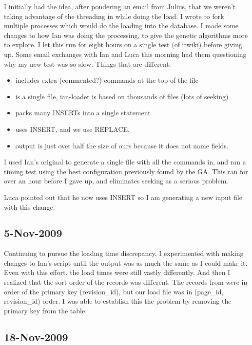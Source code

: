 I initially had the idea, after pondering an email from Julius, that we weren't
taking advantage of the threading in \mysql while doing the load.
I wrote  to fork multiple processes which would
do the loading into the database.
I made some changes to how Ian was doing the processing, to give
the genetic algorithms more to explore.
I let this run for eight hours on a single test (of itwiki) before giving up.
Some email exchanges with Ian and Luca this morning had them
questioning why my new test was so slow.
Things that are different:
\begin{itemize}
\item {} includes extra (commented?) commands at the top of the file
\item {} is a single file, ian-loader is based on thousands of files (lots of seeking)
\item {} packs many INSERTs into a single statement
\item {} uses INSERT, and we use REPLACE.
\item {} output is just over half the size of ours because it does not name fields.
\end{itemize}

I used Ian's original  to generate a single file with all the commands in,
and ran a timing test using the best configuration previously found by the GA.
This ran for over an hour before I gave up, and eliminates seeking as a serious problem.

Luca pointed out that he now uses INSERT so I am generating a new input file with this change.

\subsection{5-Nov-2009}

Continuing to pursue the loading time discrepancy, I experimented with making changes to Ian's
 script until the output was as much the same as I could make it.
Even with this effort, the load times were still vastly differently.
And then I realized that the sort order of the records was different.
The records from  were in order of the primary key (revision\_id),
but our load file was in (page\_id, revision\_id) order.
I was able to establish this the problem by removing the primary key from the table.

\subsection{18-Nov-2009}

